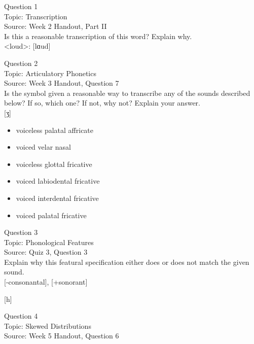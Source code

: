 \documentclass[12pt]{article}
\begin{document}
{\large Question 1}\\

Topic: Transcription\\
Source: Week 2 Handout, Part II\\

Is this a reasonable transcription of this word? Explain why.\\

<loud>: {[lɑud]}


\newpage

{\large Question 2}\\

Topic: Articulatory Phonetics\\
Source: Week 3 Handout, Question 7\\

Is the symbol given a reasonable way to transcribe any of the sounds described below? If so, which one? If not, why not? Explain your answer.\\

{[ʒ]}

\begin{itemize} \item voiceless palatal affricate \item voiced velar nasal \item voiceless glottal fricative \item voiced labiodental fricative \item voiced interdental fricative \item voiced palatal fricative \end{itemize}


\newpage

{\large Question 3}\\

Topic: Phonological Features\\
Source: Quiz 3, Question 3\\

Explain why this featural specification either does or does not match the given sound.\\

{[-consonantal]}, {[+sonorant]}

{[h]}


\newpage

{\large Question 4}\\

Topic: Skewed Distributions\\
Source: Week 5 Handout, Question 6\\
\end{document}
